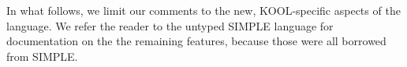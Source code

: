 \begin{latexComment}
In what follows, we limit our comments to the new, KOOL-specific
aspects of the language.  We refer the reader to the untyped SIMPLE
language for documentation on the the remaining features, because
those were all borrowed from SIMPLE.
\end{latexComment}

\vspace*{3ex}
